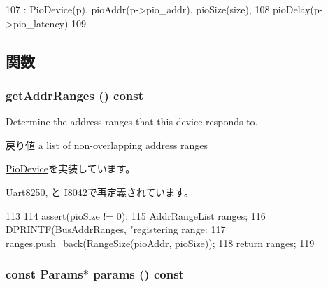 \begin{DoxyCode}
107     : PioDevice(p), pioAddr(p->pio_addr), pioSize(size),
108       pioDelay(p->pio_latency)
109 {}
\end{DoxyCode}


\subsection{関数}
\hypertarget{classBasicPioDevice_a36cf113d5e5e091ebddb32306c098fae}{
\subsubsection[{getAddrRanges}]{ getAddrRanges () const}}
\label{classBasicPioDevice_a36cf113d5e5e091ebddb32306c098fae}
Determine the address ranges that this device responds to.

\begin{DoxyReturn}{戻り値}
a list of non-\/overlapping address ranges 
\end{DoxyReturn}


\hyperlink{classPioDevice_a6e967f8921e80748eb2be35b6b481a7e}{PioDevice}を実装しています。

\hyperlink{classUart8250_a36cf113d5e5e091ebddb32306c098fae}{Uart8250}, と \hyperlink{classX86ISA_1_1I8042_a36cf113d5e5e091ebddb32306c098fae}{I8042}で再定義されています。


\begin{DoxyCode}
113 {
114     assert(pioSize != 0);
115     AddrRangeList ranges;
116     DPRINTF(BusAddrRanges, "registering range: %
117     ranges.push_back(RangeSize(pioAddr, pioSize));
118     return ranges;
119 }
\end{DoxyCode}
\hypertarget{classBasicPioDevice_acd3c3feb78ae7a8f88fe0f110a718dff}{
\subsubsection[{params}]{\setlength{\rightskip}{0pt plus 5cm}const {\bf Params}$\ast$ params () const}}
\label{classBasicPioDevice_acd3c3feb78ae7a8f88fe0f110a718dff}


